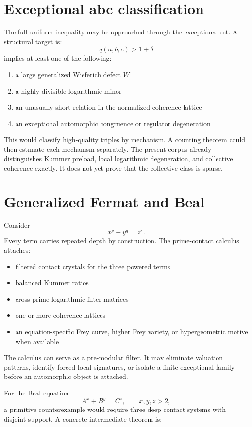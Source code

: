\section{Exceptional abc classification}
The full uniform inequality may be approached through the exceptional set. A structural target is:
\[
q(a,b,c)>1+\delta
\]
implies at least one of the following:
\begin{enumerate}[leftmargin=1.5em]
\item a large generalized Wieferich defect $W$
\item a highly divisible logarithmic minor
\item an unusually short relation in the normalized coherence lattice
\item an exceptional automorphic congruence or regulator degeneration
\end{enumerate}

This would classify high-quality triples by mechanism. A counting theorem could then estimate each mechanism separately. The present corpus already distinguishes Kummer preload, local logarithmic degeneration, and collective coherence exactly. It does not yet prove that the collective class is sparse.

\section{Generalized Fermat and Beal}
Consider
\[
x^p+y^q=z^r.
\]
Every term carries repeated depth by construction. The prime-contact calculus attaches:
\begin{itemize}[leftmargin=1.5em]
\item filtered contact crystals for the three powered terms
\item balanced Kummer ratios
\item cross-prime logarithmic filter matrices
\item one or more coherence lattices
\item an equation-specific Frey curve, higher Frey variety, or hypergeometric motive when available
\end{itemize}

The calculus can serve as a pre-modular filter. It may eliminate valuation patterns, identify forced local signatures, or isolate a finite exceptional family before an automorphic object is attached.

For the Beal equation
\[
A^x+B^y=C^z,
\qquad
x,y,z>2,
\]
a primitive counterexample would require three deep contact systems with disjoint support. A concrete intermediate theorem is:

